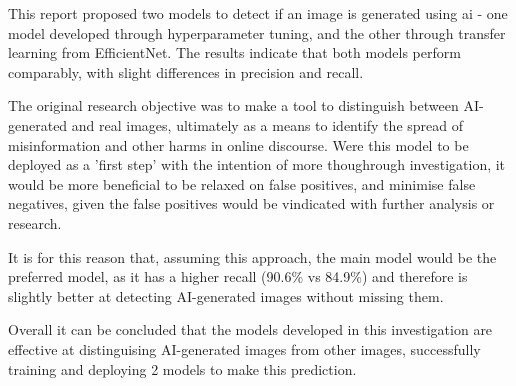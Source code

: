 This report proposed two models to detect if an image is generated using ai - one model developed through hyperparameter tuning, and the other through transfer learning from EfficientNet. The results indicate that both models perform comparably, with slight differences in precision and recall.

The original research objective was to make a tool to distinguish between AI-generated and real images, ultimately as a means to identify the spread of misinformation and other harms in online discourse. Were this model to be deployed as a 'first step' with the intention of more thoughrough investigation, it would be more beneficial to be relaxed on false positives, and minimise false negatives, given the false positives would be vindicated with further analysis or research.

It is for this reason that, assuming this approach, the main model would be the preferred model, as it has a higher recall (90.6\% vs 84.9\%) and therefore is slightly better at detecting AI-generated images without missing them. 


Overall it can be concluded that the models developed in this investigation are effective at distinguising AI-generated images from other images, successfully training and deploying 2 models to make this prediction. 
